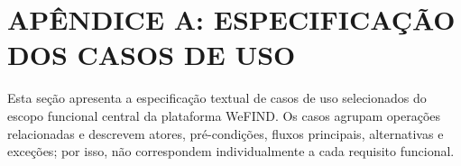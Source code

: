 \section*{APÊNDICE A: ESPECIFICAÇÃO DOS CASOS DE USO}
{}

Esta seção apresenta a especificação textual de casos de uso selecionados do escopo funcional central da plataforma WeFIND. Os casos agrupam operações relacionadas e descrevem atores, pré-condições, fluxos principais, alternativas e exceções; por isso, não correspondem individualmente a cada requisito funcional.

\vspace{0.5cm}

